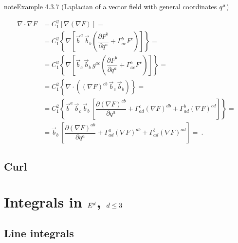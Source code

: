 \documentclass[letterpaper,10pt,english]{jupyterBook}
\begin{document}
\label{ch/tensor-algebra-calculus/calculus-euclidean:example-10}
\begin{sphinxadmonition}{note}{Example 4.3.7 (Laplacian of a vector field \sphinxhyphen{} with general coordinates \protect\(q^a\protect\))}


\begin{equation*}
\begin{split}
\nabla \cdot \nabla F
  & = C_{1}^2 \left[ \nabla \left( \nabla F \right) \right] = \\
  & = C_{1}^2 \left\{ \nabla \left[ \vec{b}^a \, \vec{b}_b \left( \dfrac{\partial F^b}{\partial q^a} + \Gamma^{b}_{ac} F^c \right) \right] \right\} = \\
  & = C_{1}^2 \left\{ \nabla \left[ \vec{b}_c \, \vec{b}_b \,  g^{ac} \left( \dfrac{\partial F^b}{\partial q^a} + \Gamma^{b}_{ac} F^c \right) \right] \right\} = \\
  & = C_{1}^2 \left\{ \nabla \cdot \left((\nabla F)^{cb} \, \vec{b}_c \, \vec{b}_b \right) \right\} = \\
  & = C_{1}^2 \left\{ \vec{b}^a \, \vec{b}_c \, \vec{b}_b \, \left[ \dfrac{\partial (\nabla F)^{cb}}{\partial q^a} 
     + \Gamma_{ad}^c (\nabla F)^{db} + \Gamma_{ad}^b (\nabla F)^{cd} \right] \right\} = \\
  & = \vec{b}_b \, \left[ \dfrac{\partial (\nabla F)^{ab}}{\partial q^a} 
     + \Gamma_{ad}^a (\nabla F)^{db} + \Gamma_{ad}^b (\nabla F)^{ad} \right] = \ .
\end{split}
\end{equation*}\end{sphinxadmonition}


\subsection{Curl}
\label{\detokenize{ch/tensor-algebra-calculus/calculus-euclidean:curl}}\label{\detokenize{ch/tensor-algebra-calculus/calculus-euclidean:tensor-calculus-differential-operators-curl}}

\section{Integrals in \protect\(E^d\protect\), \protect\(d \le 3\protect\)}
\label{\detokenize{ch/tensor-algebra-calculus/calculus-euclidean:integrals-in-e-d-d-le-3}}\label{\detokenize{ch/tensor-algebra-calculus/calculus-euclidean:tensor-calculus-integrals}}

\subsection{Line integrals}
\label{\detokenize{ch/tensor-algebra-calculus/calculus-euclidean:line-integrals}}\label{\detokenize{ch/tensor-algebra-calculus/calculus-euclidean:tensor-calculus-integrals-line}}
\end{document}
